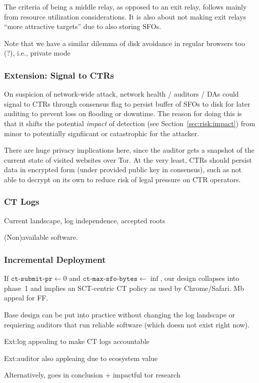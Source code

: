 The criteria of being a middle relay, as opposed to an exit relay, follows
mainly from resource utilization considerations.  It is also about not making
exit relays ``more attractive targets'' due to also storing SFOs.

Note that we have a similar dilemma of disk avoidance in regular browsers too
(?), i.e., private mode

\subsubsection{Extension: Signal to CTRs}
On suspicion of network-wide attack, network health / auditors / DAs could
signal to CTRs through consensus flag to persist buffer of SFOs to disk for
later auditing to prevent loss on flooding or downtime. The reason for doing
this is that it shifts the potential \emph{impact} of detection (see
Section~\ref{sec:risk:impact}) from minor to potentially signfiicant or
catastrophic for the attacker.

There are huge privacy implications here, since the auditor gets a snapshot of
the current state of visited websites over Tor. At the very least, CTRs should
persist data in encrypted form (under provided public key in consensus), such as
not able to decrypt on its own to reduce risk of legal pressure on CTR
operators.

\subsubsection{CT Logs} \label{sec:discussion:logs}
Current landscape, log independence, accepted roots~\cite{ct-root-landscape}

(Non)available software.

\subsubsection{Incremental Deployment}
If $\texttt{ct-submit-pr} \gets 0$ and $\texttt{ct-max-sfo-bytes} \gets
\inf$, our design collapses into phase~1 and implies an SCT-centric CT policy
as used by Chrome/Safari.  Mb appeal for FF.

Base design can be put into practice without changing the log landscape or
requiering auditors that run reliable software (which doesn not exist right
now).

Ext:log appealing to make CT logs accountable

Ext:auditor also appleaing due to ecosystem value

Alternatively, goes in conclusion + impactful tor research


